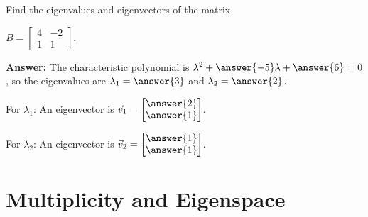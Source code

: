 \documentclass{ximera}
\begin{document}
\begin{example}
    Find the eigenvalues and eigenvectors of the matrix

    $B = \begin{bmatrix} 4 & -2 \\ 1 & 1 \end{bmatrix}$.

    \textbf{Answer:}
    The characteristic polynomial is $\lambda^2 + \answer{-5}\lambda + \answer{6} = 0$, so the eigenvalues are $\lambda_1 = \answer{3}$ and $\lambda_2 = \answer{2}$.

    For $\lambda_1$: An eigenvector is $\vec{v}_1 = \begin{bmatrix} \answer{2} \\ \answer{1} \end{bmatrix}$.

    For $\lambda_2$: An eigenvector is $\vec{v}_2 = \begin{bmatrix} \answer{1} \\ \answer{1} \end{bmatrix}$.
\end{example}

\section*{Multiplicity and Eigenspace}
\end{document}
